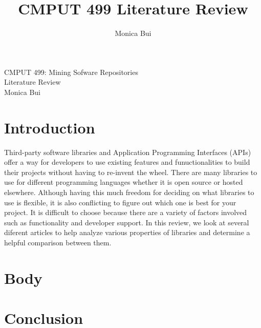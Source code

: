 \documentclass{article}
\title{CMPUT 499 Literature Review}
\author{Monica Bui}
\begin{document}
\begin{titlepage}
    \centering
    \large
    \vspace{1cm}
    CMPUT 499: Mining Sofware Repositories \\
    \vspace{1cm}
    Literature Review \\
    \vspace{1cm}
    Monica Bui
\end{titlepage}



\newpage
\section{Introduction}
Third-party software libraries and Application Programming Interfaces (APIs) offer a way for developers
to use existing features and funuctionalities to build their projects without having to re-invent the wheel.
There are many libraries to use for different programming languages whether it is open source 
or hosted elsewhere. Although having this much freedom for deciding on what libraries to use is flexible,
it is also conflicting to figure out which one is best for your project. It is difficult to choose because
there are a variety of factors involved such as functionality and developer support. 
In this review, we look at several diferent articles to help analyze various properties of libraries and 
determine a helpful comparison between them.

\section{Body}


\newpage
\section{Conclusion}
\end{document}
